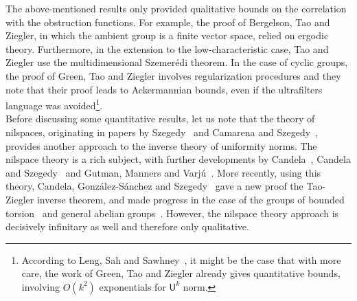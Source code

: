 \documentclass[a4paper,11pt]{article}
\numberwithin{theorem}{section}
\theoremstyle{definition}
\begin{document}
\indent The above-mentioned results only provided qualitative bounds on the correlation with the obstruction functions. For example, the proof of Bergelson, Tao and Ziegler, in which the ambient group is a finite vector space, relied on ergodic theory. Furthermore, in the extension to the low-characteristic case, Tao and Ziegler use the multidimensional Szemer\'edi theorem. In the case of cyclic groups, the proof of Green, Tao and Ziegler involves regularization procedures and they note that their proof leads to Ackermannian bounds, even if the ultrafilters language was avoided\footnote{According to Leng, Sah and Sawhney~\cite{LengSahSawhney}, it might be the case that with more care, the work of Green, Tao and Ziegler already gives quantitative bounds, involving $O(k^2)$ exponentials for $\mathsf{U}^k$ norm.}.\\
\indent Before discussing some quantitative results, let us note that the theory of nilspaces, originating in papers by Szegedy~\cite{Szeg} and Camarena and Szegedy~\cite{CamSzeg}, provides another approach to the inverse theory of uniformity norms. The nilspace theory is a rich subject, with further developments by Candela~\cite{CandelaNotes1, CandelaNotes2}, Candela and Szegedy~\cite{CandelaSzegedy1, CandelaSzegedy2} and Gutman, Manners and Varj\'u~\cite{GMV1, GMV2, GMV3}. More recently, using this theory, Candela, Gonz\'alez-S\'anchez and Szegedy~\cite{nilspacesCharp} gave a new proof the Tao-Ziegler inverse theorem, and made progress in the case of the groups of bounded torsion~\cite{nilspacesBoundedTorsion} and general abelian groups~\cite{nilspacesGeneralAbelian}. However, the nilspace theory approach is decisively infinitary as well and therefore only qualitative.\\
\end{document}
